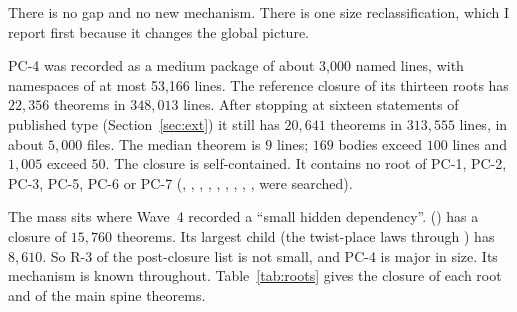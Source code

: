 \documentclass[11pt]{article}
\begin{document}
There is no gap and no new mechanism. There is one size reclassification, which I report first because it changes the global picture.

PC-4 was recorded as a medium package of about 3{,}000 named lines, with namespaces of at most 53{,}166 lines. The reference closure of its thirteen roots has $22{,}356$ theorems in $348{,}013$ lines. After stopping at sixteen statements of published type (Section~\ref{sec:ext}) it still has $20{,}641$ theorems in $313{,}555$ lines, in about $5{,}000$ files. The median theorem is $9$ lines; $169$ bodies exceed $100$ lines and $1{,}005$ exceed $50$. The closure is self-contained. It contains no root of PC-1, PC-2, PC-3, PC-5, PC-6 or PC-7 (, , , , , , , , ,  were searched).

The mass sits where Wave~4 recorded a ``small hidden dependency''.  () has a closure of $15{,}760$ theorems. Its largest child  (the twist-place laws through ) has $8{,}610$. So R-3 of the post-closure list is not small, and PC-4 is major in size. Its mechanism is known throughout. Table~\ref{tab:roots} gives the closure of each root and of the main spine theorems.
\end{document}
